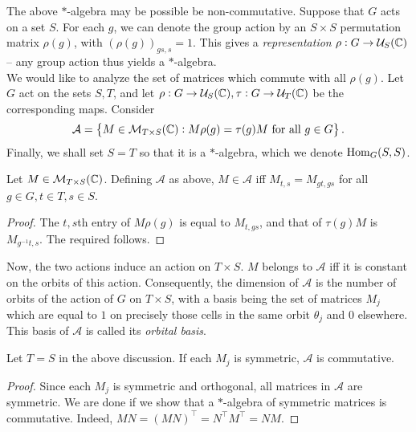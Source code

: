 	The above $*$-algebra may be possible be non-commutative. Suppose that $G$ acts on a set $S$. For each $g$, we can denote the group action by an $S \times S$ permutation matrix $\rho(g)$, with $(\rho(g))_{gs,s} = 1$. This gives a \emph{representation} $\rho : G \to \mathcal{U}_{S}(\mathbb{C})$ -- any group action thus yields a $*$-algebra.\\
	We would like to analyze the set of matrices which commute with all $\rho(g)$. Let $G$ act on the sets $S,T$, and let $\rho : G \to \mathcal{U}_S(\mathbb{C}), \tau : G \to \mathcal{U}_T(\mathbb{C})$ be the corresponding maps. Consider
	\[ \mathcal{A} = \left\{ M \in \mathcal{M}_{T \times S}(\mathbb{C}) : M \rho(g) = \tau(g) M \text{ for all $g \in G$} \right\}. \]
	Finally, we shall set $S = T$ so that it is a $*$-algebra, which we denote $\operatorname{Hom}_G(S,S)$.

	\begin{flem}
		Let $M \in \mathcal{M}_{T \times S}(\mathbb{C})$. Defining $\mathcal{A}$ as above, $M \in \mathcal{A}$ iff $M_{t,s} = M_{gt,gs}$ for all $g \in G, t \in T,s \in S$.
	\end{flem}
	\begin{proof}
		The $t,s$th entry of $M\rho(g)$ is equal to $M_{t,gs}$, and that of $\tau(g)M$ is $M_{g^{-1}t,s}$. The required follows.
	\end{proof}

	Now, the two actions induce an action on $T \times S$. $M$ belongs to $\mathcal{A}$ iff it is constant on the orbits of this action. Consequently, the dimension of $\mathcal{A}$ is the number of orbits of the action of $G$ on $T \times S$, with a basis being the set of matrices $M_j$ which are equal to $1$ on precisely those cells in the same orbit $\theta_j$ and $0$ elsewhere.\\
	This basis of $\mathcal{A}$ is called its \emph{orbital basis}.

	\begin{flem}
		\label{lem: gelfands lemma}
		Let $T = S$ in the above discussion. If each $M_j$ is symmetric, $\mathcal{A}$ is commutative.
	\end{flem}
	\begin{proof}
		Since each $M_j$ is symmetric and orthogonal, all matrices in $\mathcal{A}$ are symmetric. We are done if we show that a $*$-algebra of symmetric matrices is commutative. Indeed, $MN = (MN)^\top = N^\top M^\top = NM$.
	\end{proof}


